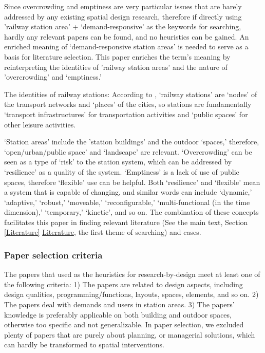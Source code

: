\documentclass[]{article}
\begin{document}
Since overcrowding and emptiness are very particular issues that are barely addressed by any existing spatial design research, therefore if directly using 'railway station area’ + ‘demand-responsive’ as the keywords for searching, hardly any relevant papers can be found, and no heuristics can be gained. An enriched meaning of ‘demand-responsive station areas’ is needed to serve as a basis for literature selection. This paper enriches the term’s meaning by reinterpreting the identities of 'railway station areas' and the nature of 'overcrowding' and ‘emptiness.’

The identities of railway stations: According to \citet{bertoliniCitiesRailsRedevelopment1998}, ‘railway stations' are `nodes' of the transport networks and `places' of the cities, so stations are fundamentally `transport infrastructures' for transportation activities and `public spaces' for other leisure activities. 

`Station areas' include the 'station buildings' and the outdoor `spaces,' therefore, ‘open/urban/public space' and ‘landscape' are relevant. `Overcrowding’ can be seen as a type of `risk' to the station system, which can be addressed by `resilience' as a quality of the system. ‘Emptiness’ is a lack of use of public spaces, therefore `flexible' use can be helpful. Both ‘resilience' and `flexible' mean a system that is capable of changing, and similar words can include `dynamic,' `adaptive,' ‘robust,’ `moveable,' `reconfigurable,' `multi-functional (in the time dimension),' `temporary,' `kinetic', and so on. The combination of these concepts facilitates this paper in finding relevant literature (See the main text, Section \ref{Literature} \hyperref[Literature]{Literature}, the first theme of searching) and cases.





\subsubsection{Paper selection criteria}
The papers that used as the heuristics for research-by-design meet at least one of the following criteria: 1) The papers are related to design aspects, including design qualities, programming/functions, layouts, spaces, elements, and so on.
2) The papers deal with demands and users in station areas. 
3) The papers' knowledge is preferably applicable on both building and outdoor spaces, otherwise too specific and not generalizable. In paper selection, we excluded plenty of papers that are purely about planning, or managerial solutions, which can hardly be transformed to spatial interventions.
\end{document}
